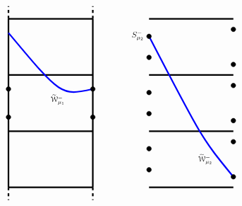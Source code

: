 \documentclass[11 pt]{article}
\renewcommand\({\left(}
\renewcommand\){\right)}
\newcommand\wt{\widetilde}
\newcommand\<{\langle}
\renewcommand\>{\rangle}
\newcommand\8{\infty}
\newcommand{\mc}{\mathcal}
\begin{document}
\begin{figure}[h]
\[\begin{tikzpicture}[scale = 0.50]
\draw[ultra thick] (13,-2) -- (7,-2);
\draw[ultra thick] (13,2) -- (7,2);
\draw[ultra thick] (13,-6) -- (7,-6);
\draw[ultra thick] (13,6) -- (7,6);



\draw [ ultra thick, blue] (7,4.75) .. controls (10.75,-2.5) .. (13,-5.25);

\draw (11,-4) node [scale = .75] {$\wt{\mc{W}}^-_{\mu_2}$};



\node [scale = .50] [circle, draw, fill = black] at (7,-.75)  {};
\node [scale = .50] [circle, draw, fill = black] at (7,.75)  {};
\node [scale = .50] [circle, draw, fill = black] at (13,-1.25)  {};
\node [scale = .50] [circle, draw, fill = black] at (13,1.25)  {};


\node [scale = .50] [circle, draw, fill = black] at (7,-4.75)  {};
\node [scale = .50] [circle, draw, fill = black] at (7,-3.25)  {};
\node [scale = .50] [circle, draw, fill = black] at (13,-5.25)  {};
\node [scale = .50] [circle, draw, fill = black] at (13,-2.75)  {};


\node [scale = .50] [circle, draw, fill = black] at (7,3.25)  {};
\node [scale = .50] [circle, draw, fill = black] at (7,4.75)  {};
\node [scale = .50] [circle, draw, fill = black] at (13,2.75)  {};
\node [scale = .50] [circle, draw, fill = black] at (13,5.25)  {};


\draw (6.2,4.8) node [scale = .8] {$S^-_{\mu_2}$};


\draw[ultra thick] (-3,-6) -- (-3, 6);
\draw[ultra thick] (3,-6) -- (3,6);

\draw[ultra thick, dashed] (-3,6) -- (-3,6.9);
\draw[ultra thick, dashed] (3,6) -- (3,6.9);
\draw[ultra thick, dashed] (-3,-6) -- (-3,-6.9);
\draw[ultra thick, dashed] (3,-6) -- (3,-6.9);

\draw[ultra thick] (-3,-2) -- (3,-2);
\draw[ultra thick] (-3,2) -- (3,2);
\draw[ultra thick] (-3,-6) -- (3,-6);
\draw[ultra thick] (-3,6) -- (3,6);



\draw [ ultra thick, blue] (-3,5) .. controls (0.75,0.5) .. (3,1);

\draw (.5,.25) node [scale = .75] {$\wt{\mc{W}}^-_{\mu_1}$};
 


\node [scale = .50] [circle, draw, fill = black] at (-3,-1)  {};
\node [scale = .50] [circle, draw, fill = black] at (-3,1)  {};
\node [scale = .50] [circle, draw, fill = black] at (3,-1)  {};
\node [scale = .50] [circle, draw, fill = black] at (3,1)  {};


\end{tikzpicture}\]
\end{figure}
\end{document}
